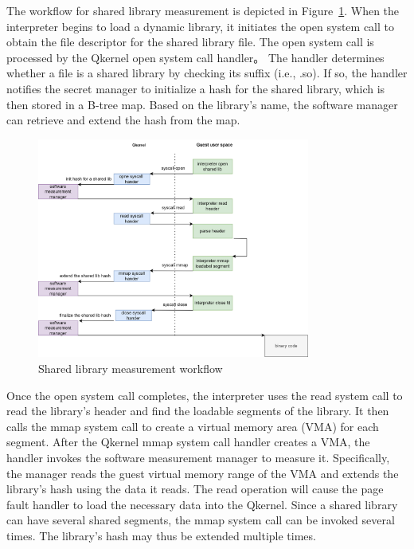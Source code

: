 The workflow for shared library measurement is depicted in Figure~\ref{fig:measure_load_shared_libarart}. When the interpreter begins to load a dynamic library, it initiates the open system call to obtain the file descriptor for the shared library file. The open system call is processed by the Qkernel open system call handler。 
The handler determines whether a file is a shared library by checking its suffix (i.e., .so). If so, the handler notifies the secret manager to initialize a hash for the shared library, which is then stored in a B-tree map. Based on the library's name, the software manager can retrieve and extend the 
hash from the map.

\begin{figure}[htp]
    \centering
    \includegraphics[width=0.8\textwidth]{images/measure_load_shared_libarart.png}
    \caption[Shared library measurement workflow]{Shared library measurement workflow}
    \label{fig:measure_load_shared_libarart}
\end{figure}


Once the open system call completes, the interpreter uses the read system call to read the library's header and find the loadable segments of the library. It then calls the mmap system call to create a virtual memory area (VMA) for each segment. After the Qkernel mmap system call handler creates a 
VMA,  the handler invokes the software measurement manager to measure it. Specifically, the manager reads the guest virtual memory range of the VMA and extends the library's hash using the data it reads. The read operation will cause the page fault handler to load the necessary data into the Qkernel. 
Since a shared library can have several shared segments, the mmap system call can be invoked several times. The library's hash may thus be extended multiple times.


